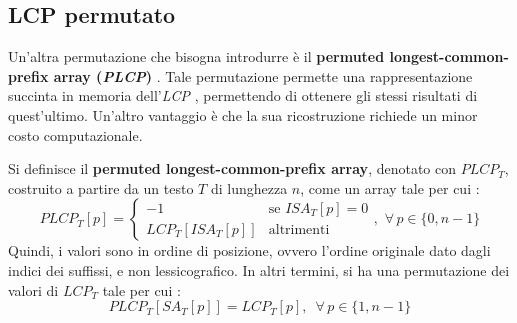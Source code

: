 \subsection{LCP permutato}
Un'altra permutazione che bisogna introdurre è il \textbf{permuted
  longest-common-prefix array (\textit{PLCP})} \cite{plcp}.
Tale permutazione
permette una rappresentazione succinta in memoria dell'\textit{LCP}
\cite{plcp2},
permettendo di ottenere gli stessi risultati di quest'ultimo. Un'altro vantaggio
è che la sua ricostruzione richiede un minor costo computazionale.
\begin{definizione}
  Si definisce il \textbf{permuted longest-common-prefix array}, denotato con
  $PLCP_T$, costruito a partire da un testo $T$ di lunghezza $n$, come un
  array tale per cui \cite{phoni}:
  \begin{equation}
    \label{eq:plcpdef1}
    PLCP_T[p]=
    \begin{cases}
      -1&\mbox{se }ISA_T[p]=0\\
      LCP_T[ISA_T[p]]&\mbox{altrimenti}
    \end{cases},\,\,\forall\, p\in\{0,n-1\}
  \end{equation}
  Quindi, i valori sono in ordine di posizione, ovvero l'ordine originale dato
  dagli indici dei suffissi, e non
  lessicografico. In altri termini, si ha una permutazione dei valori di $LCP_T$
  tale per cui \cite{plcp}:
  \begin{equation}
    \label{eq:plcpdef2}
    PLCP_T[SA_T[p]] = LCP_T[p],\,\,\,\forall\, p\in\{1,n-1\}
  \end{equation}
\end{definizione}
